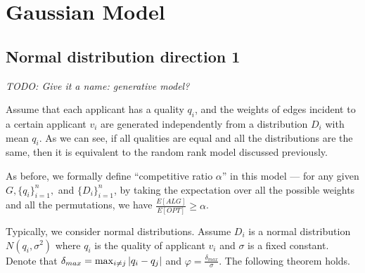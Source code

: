 \chapter{Gaussian Model}

\section{Normal distribution direction 1}

\emph{TODO: Give it a name: generative model?}



Assume that each applicant has a quality $q_i$, and the weights of edges
incident to a certain applicant $v_i$ are generated independently from
a distribution $D_i$ with mean $q_i$.
As we can see, if all qualities are equal and all the distributions are the same, then it is equivalent to the random rank model
discussed previously.

As before, we formally define ``competitive ratio $\alpha$'' in this model --- for any given $G, \{q_i\}_{i=1}^n,$ and $\{D_i\}_{i=1}^n$, by taking the expectation over all the possible weights and all the permutations, we have $\frac{E[ALG]}{E[OPT]} \ge \alpha$.







Typically, we consider normal distributions.
Assume $D_i$ is a normal distribution $N(q_i, \sigma^2)$ where
$q_i$ is the quality of applicant $v_i$ and $\sigma$ is a fixed constant.
Denote that $\delta_{max} = \max_{i \neq j} \left\vert q_i - q_j\right\vert$ and
$\varphi = \frac{\delta_{max}}{\sigma}$. The following theorem holds.

